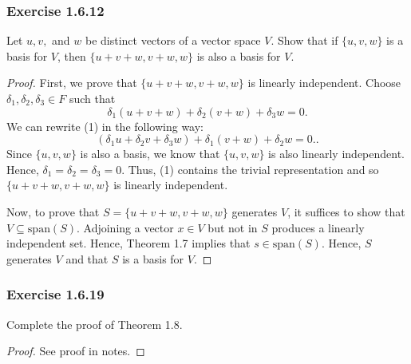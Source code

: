 \subsubsection{Exercise 1.6.12}
Let \( u,v,  \) and \( w  \) be distinct vectors of a vector space \( V  \). Show that if \( \{ u,v,w \}  \) is a basis for \( V  \), then \( \{ u + v   + w , v + w , w  \}  \) is also a basis for \( V  \). 
\begin{proof}
    First, we prove that \( \{ u+v + w, v + w , w  \}   \) is linearly independent. Choose \( \delta_{1} , \delta_{2} , \delta_{3} \in F  \) such that 
    \[  \delta_{1} (u+v+w) + \delta_{2} (v +w) + \delta_{3} w = 0. \tag{1}  \]
    We can rewrite (1) in the following way:
    \[ (\delta_{1} u + \delta_{2} v + \delta_{3} w ) + \delta_{1} (v+w) + \delta_{2} w  = 0.  \tag{2}.  \]
    Since \( \{ u,v, w \}  \) is also a basis, we know that \( \{ u,v,w  \}   \) is also linearly independent. Hence, \( \delta_{1} = \delta_{2} = \delta_{3} = 0  \). Thus, (1) contains the trivial representation and so \( \{ u + v + w, v + w , w  \}  \) is linearly independent. 

    Now, to prove that \( S = \{ u+v+w, v + w , w  \}   \) generates \( V  \), it suffices to show that \( V \subseteq \text{span}(S) \). Adjoining a vector \( x \in  V  \) but not in \( S  \) produces a linearly independent set. Hence, Theorem 1.7 implies that \( s \in \text{span}(S) \). Hence, \( S  \) generates \( V   \) and that \( S  \) is a basis for \( V  \).

\end{proof}


\subsubsection{Exercise 1.6.19} Complete the proof of Theorem 1.8.
\begin{proof}
See proof in notes.
\end{proof}


